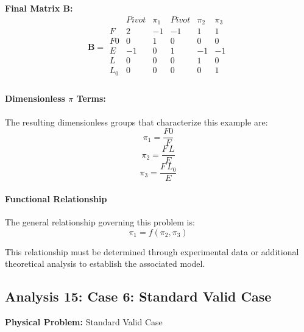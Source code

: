         \textbf{Final Matrix $\mathbf{B}$:}
        \[\mathbf{B} = \begin{array}{r|rrrrr}
        & Pivot & \pi_{1} & Pivot & \pi_{2} & \pi_{3} \\
        \hline
        F & 2 & -1 & -1 & 1 & 1 \\
F0 & 0 & 1 & 0 & 0 & 0 \\
E & -1 & 0 & 1 & -1 & -1 \\
L & 0 & 0 & 0 & 1 & 0 \\
L_0 & 0 & 0 & 0 & 0 & 1 \\

        \end{array}\]

        \paragraph{Dimensionless $\pi$ Terms: }
        The resulting dimensionless groups that characterize this example are:
\begin{equation}
\pi_{1} = \frac{F0}{F}
\end{equation}
\begin{equation}
\pi_{2} = \frac{F \, L}{E}
\end{equation}
\begin{equation}
\pi_{3} = \frac{F \, L_0}{E}
\end{equation}

                    \paragraph{Functional Relationship}
                    The general relationship governing this problem is:
                    \begin{equation}
                    \pi_1 = f(\pi_2,\pi_3)
                    \end{equation}

                    This relationship must be determined through experimental data or additional theoretical analysis to establish the associated model.


\subsection{Analysis 15: Case 6: Standard Valid Case}
\label{sec:Case_6_Standard_Valid_Case}

\begin{problembox}
\textbf{Physical Problem:} Standard Valid Case
\end{problembox}


